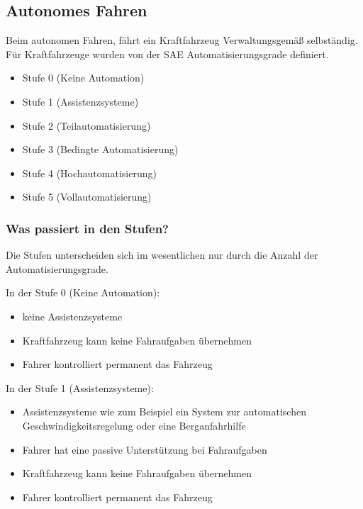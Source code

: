 \subsection{Autonomes Fahren}
Beim autonomen Fahren, fährt ein Kraftfahrzeug Verwaltungsgemäß selbständig.
Für Kraftfahrzeuge wurden von der \ac{SAE} Automatisierungsgrade definiert\cite{PRACTICE}.
\begin{itemize}
	\item Stufe 0 (Keine Automation)
	\item Stufe 1 (Assistenzsysteme)
	\item Stufe 2 (Teilautomatisierung)
	\item Stufe 3 (Bedingte Automatisierung)
	\item Stufe 4 (Hochautomatisierung)
	\item Stufe 5 (Vollautomatisierung)
\end{itemize}
\subsubsection{Was passiert in den Stufen?}
Die Stufen unterscheiden sich im wesentlichen nur durch die Anzahl der Automatisierungsgrade.

\vspace{0.5cm}

In der Stufe 0 (Keine Automation):
\begin{itemize}
	\item keine Assistenzsysteme
	\item Kraftfahrzeug kann keine Fahraufgaben übernehmen
	\item Fahrer kontrolliert permanent das Fahrzeug
\end{itemize}

\vspace{0.5cm}

In der Stufe 1 (Assistenzsysteme):
\begin{itemize}
	\item Assistenzsysteme wie zum Beispiel ein System zur automatischen Geschwindigkeitsregelung oder eine Berganfahrhilfe
	\item Fahrer hat eine passive Unterstützung bei Fahraufgaben
	\item Kraftfahrzeug kann keine Fahraufgaben übernehmen
	\item Fahrer kontrolliert permanent das Fahrzeug
\end{itemize}

\vspace{0.5cm}

